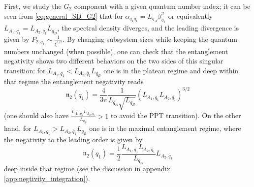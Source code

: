 \documentclass[aps,pra,reprint,superscriptaddress,twocolumn,notitlepage]{revtex4-1}
\numberwithin{equation}{section}
\begin{document}
First, we study the $G_2$ component with a given quantum number index; it can be seen from \eqref{eq:general_SD_G2} that for $\alpha_{q_1\bar{q}_1} = L_{q_A} \beta_{q_1}^2$ or equivalently $L_{A_1,q_1} = L_{A_2,\bar{q}_1} L_{q_B}$, the spectral density diverges, and the leading divergence is given by $P_{2,q_1} \sim \frac{1}{\xi^{1/2}}$. By changing subsystem sizes while keeping the quantum numbers unchanged (when possible), one can check that the entanglement negativity shows two different behaviors on the two sides of this singular transition: for $L_{A_1,q_1} < L_{A_2,\bar{q}_1} L_{q_B}$ one is in the plateau regime and deep within that regime the entanglement negativity reads 
\begin{equation}
\mathfrak{n}_2(q_1) = \frac{4}{3\pi} \frac{1}{L_{q_A} \sqrt{L_{q_B}}}{ \left( L_{A_1,q_1 }  L_{A_2,\bar{q_1} }  \right)^{3/2} }
\end{equation}
(one should also have $\frac{L_{A_1,q_1 }  L_{A_2,\bar{q_1} }}{L_{q_B}}>1$ to avoid the PPT transition).
On the other hand, for $L_{A_1,q_1} > L_{A_2,\bar{q}_1} L_{q_B}$ one is in the maximal entanglement regime, where the negativity to the leading order is given by
\begin{equation}\label{eq:neg_sym_resolved_max_entanglement_G2}
    \mathfrak{n}_{2}(q_1)
    = \frac12 \frac{L_{A_1,q_1}  L_{A_2,\bar{q}_1} }{ L_{q_A}}  L_{A_2,\bar{q}_1}
\end{equation}
deep inside that regime (see the discussion in appendix \ref{app:negtivity_integration}).
\end{document}
